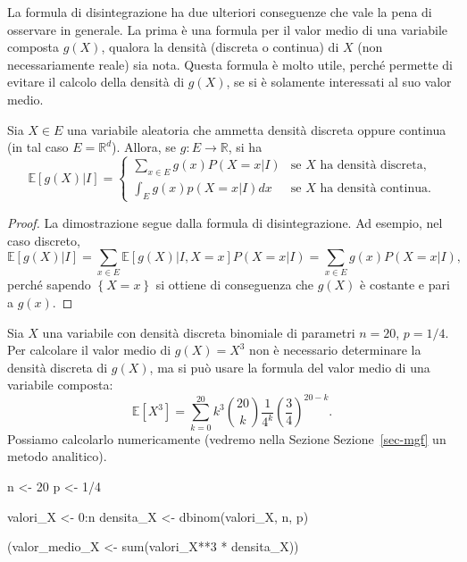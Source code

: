 \documentclass[
  italian,
  letterpaper,
]{book}
\newenvironment{Shaded}{\begin{snugshade}}{\end{snugshade}}
\newcommand{\DecValTok}[1]{\textcolor[rgb]{0.68,0.00,0.00}{#1}}
\newcommand{\FunctionTok}[1]{\textcolor[rgb]{0.28,0.35,0.67}{#1}}
\newcommand{\NormalTok}[1]{\textcolor[rgb]{0.00,0.23,0.31}{#1}}
\newcommand{\OtherTok}[1]{\textcolor[rgb]{0.00,0.23,0.31}{#1}}
\newcommand{\SpecialCharTok}[1]{\textcolor[rgb]{0.37,0.37,0.37}{#1}}
\newcommand{\bra}[1]{\left( #1 \right)}
\newcommand{\sqa}[1]{\left[ #1 \right]}
\newcommand{\cur}[1]{\left\{ #1 \right\}}
\newcommand{\R}{\mathbb{R}}
\newcommand{\E}[1]{\mathbb{E}\sqa{#1}}
\theoremstyle{definition}
\theoremstyle{remark}
\begin{document}
La formula di disintegrazione ha due ulteriori conseguenze che vale la
pena di osservare in generale. La prima è una formula per il valor medio
di una variabile composta \(g(X)\), qualora la densità (discreta o
continua) di \(X\) (non necessariamente reale) sia nota. Questa formula
è molto utile, perché permette di evitare il calcolo della densità di
\(g(X)\), se si è solamente interessati al suo valor medio.

Sia \(X \in E\) una variabile aleatoria che ammetta densità discreta
oppure continua (in tal caso \(E = \R^d\)). Allora, se \(g: E \to \R\),
si ha
\[ \E{g(X)|I} = \begin{cases} \sum_{x \in E} g(x) P(X= x|I ) & \text{se $X$ ha densità discreta,}\\
\int_{E} g(x) p(X= x|I) dx & \text{se $X$ ha densità continua.}
\end{cases}\]

\begin{proof}
La dimostrazione segue dalla formula di disintegrazione. Ad esempio, nel
caso discreto,
\[ \E{g(X)|I}  = \sum_{x \in E} \E{g(X)|I, X=x} P(X=x|I) = \sum_{x \in E} g(x) P(X=x|I),\]
perché sapendo \(\cur{X=x}\) si ottiene di conseguenza che \(g(X)\) è
costante e pari a \(g(x)\).
\end{proof}

Sia \(X\) una variabile con densità discreta binomiale di parametri
\(n=20\), \(p=1/4\). Per calcolare il valor medio di \(g(X) = X^3\) non
è necessario determinare la densità discreta di \(g(X)\), ma si può
usare la formula del valor medio di una variabile composta:
\[ \E{X^3} = \sum_{k=0}^{20} k^3 {20 \choose k} \frac{1}{4^k}\bra{\frac{3}4}^{20-k}.\]
Possiamo calcolarlo numericamente (vedremo nella Sezione
Sezione~\ref{sec-mgf} un metodo analitico).

\begin{Shaded}
\begin{Highlighting}[]
\NormalTok{n }\OtherTok{\textless{}{-}} \DecValTok{20}
\NormalTok{p }\OtherTok{\textless{}{-}} \DecValTok{1}\SpecialCharTok{/}\DecValTok{4}

\NormalTok{valori\_X }\OtherTok{\textless{}{-}} \DecValTok{0}\SpecialCharTok{:}\NormalTok{n}
\NormalTok{densita\_X }\OtherTok{\textless{}{-}} \FunctionTok{dbinom}\NormalTok{(valori\_X, n, p)}

\NormalTok{(valor\_medio\_X }\OtherTok{\textless{}{-}} \FunctionTok{sum}\NormalTok{(valori\_X}\SpecialCharTok{**}\DecValTok{3} \SpecialCharTok{*}\NormalTok{ densita\_X))}
\end{Highlighting}
\end{Shaded}
\end{document}
